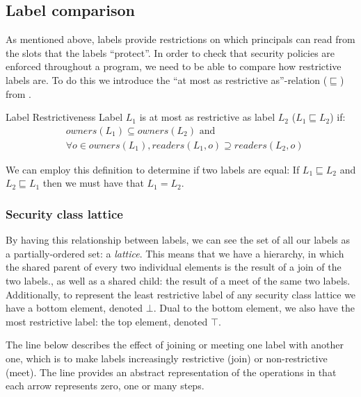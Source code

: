 \subsection{Label comparison}
As mentioned above, labels provide restrictions on which principals can read from the slots that the labels ``protect''.
In order to check that security policies are enforced throughout a program, we need to be able to compare how restrictive labels are.
To do this we introduce the ``at most as restrictive as''-relation ($\sqsubseteq$) from \cite{myers1997}.

\begin{definition}{Label Restrictiveness}
  Label $L_1$ is at most as restrictive as label $L_2$ ($L_1 \sqsubseteq L_2$) if:
  \begin{align*}
    & owners(L_1) \subseteq owners(L_2) \text{ and} \\
    & \forall o \in owners(L_1) , readers(L_1, o) \supseteq readers(L_2, o)
  \end{align*}
\end{definition}

We can employ this definition to determine if two labels are equal:
If $L_1 \sqsubseteq L_2$ and $L_2 \sqsubseteq L_1$ then we must have that $L_1 = L_2$.

\subsubsection{Security class lattice}
By having this relationship between labels, we can see the set of all our labels as a partially-ordered set: a \emph{lattice}.
This means that we have a hierarchy, in which the shared parent of every two individual elements is the result of a join of the two labels., as well as a shared child: the result of a meet of the same two labels.
Additionally, to represent the least restrictive label of any security class lattice we have a bottom element, denoted $\bot$.
Dual to the bottom element, we also have the most restrictive label: the top element, denoted $\top$.

The line below describes the effect of joining or meeting one label with another one, which is to make labels increasingly restrictive (join) or non-restrictive (meet).
The line provides an abstract representation of the operations in that each arrow represents zero, one or many steps.

\begin{center}
\end{center}

